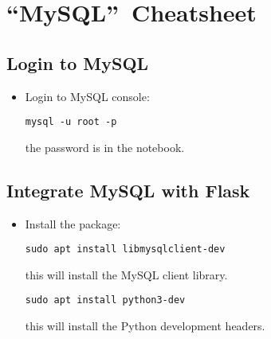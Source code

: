 \section{\textquotedblleft MySQL\textquotedblright\ Cheatsheet}

%

\subsection{Login to MySQL}

\begin{itemize}
    \item Login to MySQL console:
    \begin{verbatim}
mysql -u root -p
    \end{verbatim}
    the password is in the notebook.
\end{itemize}

\subsection{Integrate MySQL with Flask}

\begin{itemize}
    \item Install the package:
    \begin{verbatim}
sudo apt install libmysqlclient-dev
    \end{verbatim}
    this will install the MySQL client library.
    \begin{verbatim}
sudo apt install python3-dev
    \end{verbatim}
    this will install the Python development headers.
\end{itemize}
